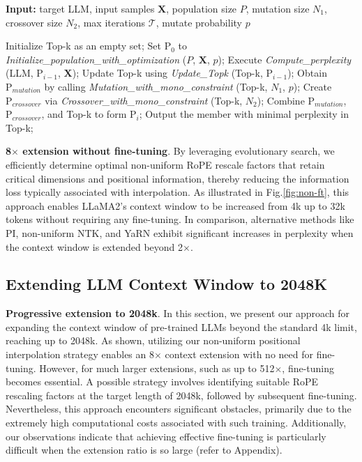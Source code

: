 \begin{algorithm}[t]
	\small
	\caption{The search algorithm}
	\textbf{Input:} target LLM, input samples $\mathbf{X}$,   population size $P$, mutation size $N_1$, crossover size $N_2$, max iterations $\mathcal{T}$, mutate probability $p$\\

	\begin{algorithmic}[1]
		\label{alg:search}
		\STATE Initialize Top-k as an empty set;	
		\STATE Set $\text{P}_0$ to \textit{Initialize\_population\_with\_optimization} ($P$, $\mathbf{X}$, $p$); 
		\STATE Execute \textit{Compute\_perplexity} (LLM, $\text{P}_{i-1}$, $\mathbf{X}$);
		\STATE Update Top-k using \textit{Update\_Topk} (Top-k, $\text{P}_{i-1}$);
		\STATE Obtain $\text{P}_{mutation}$ by calling \textit{Mutation\_with\_mono\_constraint} (Top-k, $N_1$, $p$); 
		\STATE Create $\text{P}_{crossover}$ via \textit{Crossover\_with\_mono\_constraint} (Top-k, $N_2$);
		\STATE Combine $\text{P}_{mutation}$, $\text{P}_{crossover}$, and Top-k to form $\text{P}_i$;
		\ENDFOR
		\STATE Output the member with minimal perplexity in Top-k;
	\end{algorithmic}
\end{algorithm}

\textbf{8$\times$ extension without fine-tuning}. By leveraging evolutionary search, we efficiently determine optimal non-uniform RoPE rescale factors that retain critical dimensions and positional information, thereby reducing the information loss typically associated with interpolation. As illustrated in Fig.\ref{fig:non-ft}, this approach enables LLaMA2's context window to be increased from 4k up to 32k tokens without requiring any fine-tuning. In comparison, alternative methods like PI, non-uniform NTK, and YaRN exhibit significant increases in perplexity when the context window is extended beyond 2$\times$.

\subsection{Extending LLM Context Window to 2048K}
\label{sec:extendto2048k}

\textbf{Progressive extension to 2048k}. In this section, we present our approach for expanding the context window of pre-trained LLMs beyond the standard 4k limit, reaching up to 2048k. As shown, utilizing our non-uniform positional interpolation strategy enables an 8$\times$ context extension with no need for fine-tuning. However, for much larger extensions, such as up to 512$\times$, fine-tuning becomes essential. A possible strategy involves identifying suitable RoPE rescaling factors at the target length of 2048k, followed by subsequent fine-tuning. Nevertheless, this approach encounters significant obstacles, primarily due to the extremely high computational costs associated with such training. Additionally, our observations indicate that achieving effective fine-tuning is particularly difficult when the extension ratio is so large (refer to Appendix).

